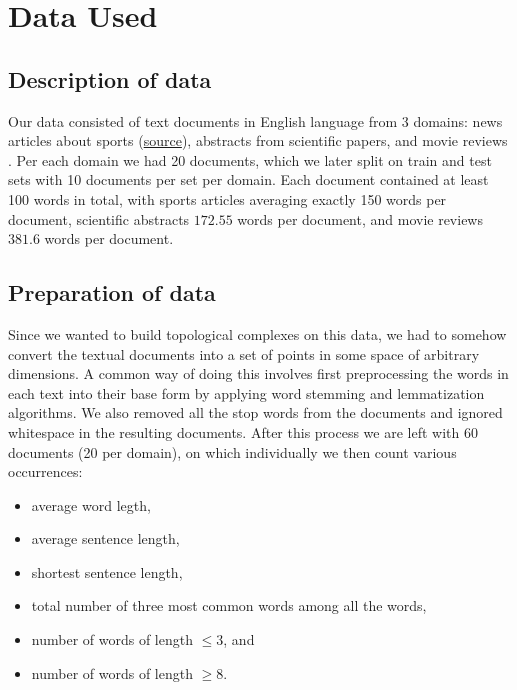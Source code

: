 \section{Data Used}
\label{sec:data_used}

\subsection{Description of data}
\label{sub:description_of_data}

Our data consisted of text documents in English language from 3 domains: news
articles about sports (\href{http://mlg.ucd.ie/datasets/bbc.html}{source}), abstracts from scientific papers, and movie reviews
. Per each domain we had 20 documents, which we later
split on train and test sets with 10 documents per set per domain. Each
document contained at least 100 words in total, with sports articles averaging
exactly 150 words per document, scientific abstracts $172.55$ words per
document, and movie reviews $381.6$ words per document.

\subsection{Preparation of data}
\label{sub:preparation_of_data}

Since we wanted to build topological complexes on this data, we had to somehow
convert the textual documents into a set of points in some space of arbitrary
dimensions. A common way of doing this involves first preprocessing the words
in each text into their base form by applying word stemming and lemmatization
algorithms. We also removed all the stop words from the documents and ignored
whitespace in the resulting documents. After this process we are left with 60
documents (20 per domain), on which individually we then count various
occurrences:

\begin{itemize}
  \item average word legth,
  \item average sentence length,
  \item shortest sentence length,
  \item total number of three most common words among all the words,
  \item number of words of length $\le 3$, and
  \item number of words of length $\ge 8$.
\end{itemize}

